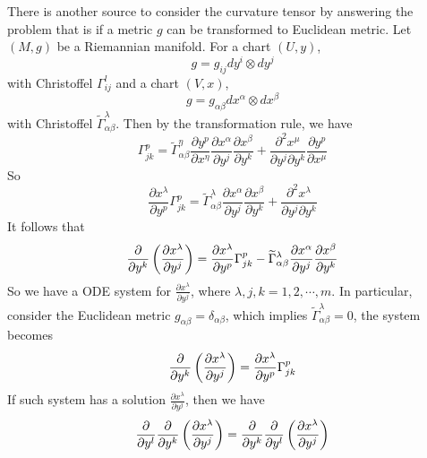\begin{enumerate}[label=\arabic{*}.]
	\begin{rmk}
		There is another source to consider the curvature tensor by answering the problem that is if a metric $g$ can be transformed to Euclidean metric. Let $(M,g)$ be a Riemannian manifold. For a chart $(U,y)$,
		\begin{equation*}
			g = g_{ij}dy^i\otimes dy^j
		\end{equation*}
		with Christoffel $\Gamma^l_{ij}$ and a chart $(V,x)$,
		\begin{equation*}
			g = g_{\alpha\beta}dx^\alpha \otimes dx^\beta
		\end{equation*}
		with Christoffel $\widetilde{\Gamma}^\lambda_{\alpha\beta}$. Then by the transformation rule, we have
		\begin{equation*}
			\Gamma^p_{jk} = \widetilde{\Gamma}^\eta_{\alpha\beta}\frac{\partial y^p}{\partial x^\eta}\frac{\partial x^\alpha}{\partial y^j}\frac{\partial x^\beta}{\partial y^k} + \frac{\partial^2 x^\mu}{\partial y^j \partial y^k} \frac{\partial y^p}{\partial x^\mu}
		\end{equation*}
		So
		\begin{equation*}
			\frac{\partial x^\lambda}{\partial y^p}\Gamma^p_{jk} = \widetilde{\Gamma}^\lambda_{\alpha\beta}\frac{\partial x^\alpha}{\partial y^j}\frac{\partial x^\beta}{\partial y^k} + \frac{\partial^2 x^\lambda}{\partial y^j \partial y^k}
		\end{equation*}
		It follows that
		\begin{equation*}
			\frac{\partial}{\partial y^k}\left(\frac{\partial x^\lambda}{\partial y^j}\right) = \frac{\partial x^\lambda}{\partial y^p}\Gamma^p_{jk} - \widetilde{\Gamma}^\lambda_{\alpha\beta}\frac{\partial x^\alpha}{\partial y^j}\frac{\partial x^\beta}{\partial y^k} 
		\end{equation*}
		So we have a ODE system for $\frac{\partial x^\lambda}{\partial y^j}$, where $\lambda,j,k = 1,2,\cdots,m$. In particular, consider the Euclidean metric $g_{\alpha\beta} = \delta_{\alpha \beta}$, which implies $\widetilde{\Gamma}^\lambda_{\alpha\beta} = 0$, the system becomes
		\begin{equation*}
			\frac{\partial}{\partial y^k}\left(\frac{\partial x^\lambda}{\partial y^j}\right) = \frac{\partial x^\lambda}{\partial y^p}\Gamma^p_{jk}
		\end{equation*}
		If such system has a solution $\frac{\partial x^\lambda}{\partial y^j}$, then we have
		\begin{equation}\label{eq:sourceofcurvature}
		 	\frac{\partial}{\partial y^l}\frac{\partial}{\partial y^k}\bc{\frac{\partial x^\lambda}{\partial y^j}} = \frac{\partial}{\partial y^k}\frac{\partial}{\partial y^l}\bc{\frac{\partial x^\lambda}{\partial y^j}}

\end{equation}
\end{rmk}
\end{enumerate}
